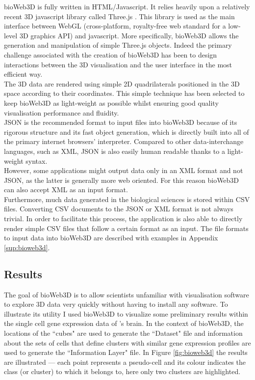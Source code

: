 bioWeb3D is fully written in HTML/Javascript. It relies heavily upon a relatively recent 3D javascript library called Three.js \cite{three}. This library is used as the main interface between WebGL (cross-platform, royalty-free web standard for a low-level 3D graphics API) \cite{webgl} and javascript. More specifically, bioWeb3D allows the generation and manipulation of simple Three.js objects. Indeed the primary challenge associated with the creation of bioWeb3D has been to design interactions between the 3D visualisation and the user interface in the most efficient way.\\

The 3D data are rendered using simple 2D quadrilaterals positioned in the 3D space according to their coordinates. This simple technique has been selected to keep bioWeb3D as light-weight as possible whilst ensuring good quality visualisation performance and fluidity.\\


JSON is the recommended format to input files into bioWeb3D because of its rigorous structure and its fast object generation, which is directly built into all of the primary internet browsers' interpreter. Compared to other data-interchange languages, such as XML, JSON is also easily human readable thanks to a light-weight syntax.\\

However, some applications might output data only in an XML format and not JSON, as the latter is generally more web oriented. For this reason bioWeb3D can also accept XML as an input format.\\

Furthermore, much data generated in the biological sciences is stored within CSV files. Converting CSV documents to the JSON or XML format is not always trivial. In order to facilitate this process, the application is also able to directly render simple CSV files that follow a certain format as an input. The file formats to input data into bioWeb3D are described with examples in Appendix \ref{sup:bioweb3d}.

	\subsection{Results}

	The goal of bioWeb3D is to allow scientists unfamiliar with visualisation software to explore 3D data very quickly without having to install any software.
	To illustrate its utility I used bioWeb3D to visualize some preliminary results within the single cell gene expression data of \platy{}'s brain. In the context of bioWeb3D, the locations of the ``cubes" are used to generate the ``Dataset" file and information about the sets of cells that define clusters with similar gene expression profiles are used to generate the ``Information Layer" file. In Figure \ref{fig:bioweb3d} the results are illustrated ---  each point represents a pseudo-cell and its colour indicates the class (or cluster) to which it belongs to, here only two clusters are highlighted. 
	
